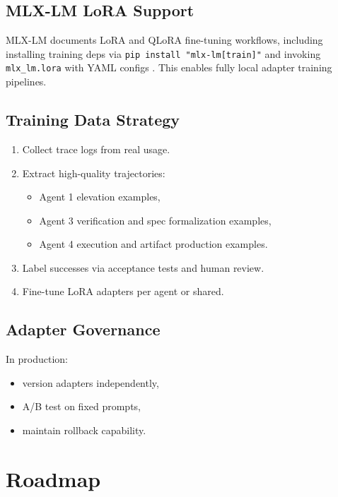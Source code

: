 \documentclass[11pt]{article}
\begin{document}
\subsection{MLX-LM LoRA Support}

MLX-LM documents LoRA and QLoRA fine-tuning workflows, including installing training deps via \texttt{pip install "mlx-lm[train]"} and invoking \texttt{mlx\_lm.lora} with YAML configs \cite{MLXLM_LoRA}.
This enables fully local adapter training pipelines.

\subsection{Training Data Strategy}

\begin{enumerate}
  \item Collect trace logs from real usage.
  \item Extract high-quality trajectories:
    \begin{itemize}
      \item Agent 1 elevation examples,
      \item Agent 3 verification and spec formalization examples,
      \item Agent 4 execution and artifact production examples.
    \end{itemize}
  \item Label successes via acceptance tests and human review.
  \item Fine-tune LoRA adapters per agent or shared.
\end{enumerate}

\subsection{Adapter Governance}

In production:
\begin{itemize}
  \item version adapters independently,
  \item A/B test on fixed prompts,
  \item maintain rollback capability.
\end{itemize}

\section{Roadmap}
\end{document}
